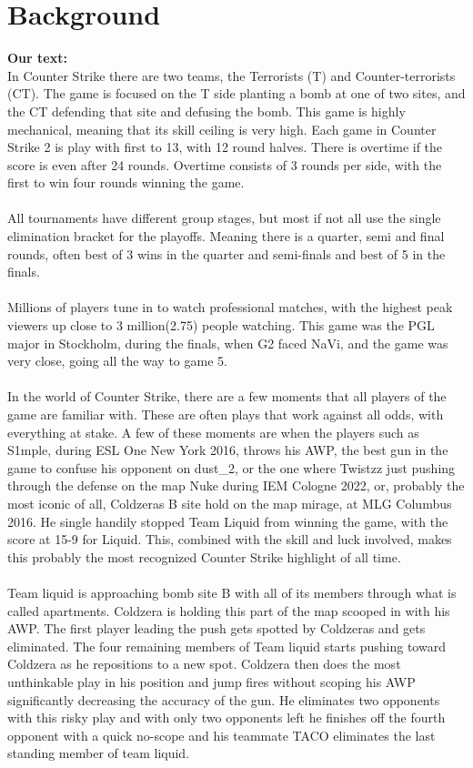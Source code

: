 \documentclass[a4paper,twoside]{bth}
\begin{document}
\section{Background}
\textbf{Our text:}\\
In Counter Strike there are two teams, the Terrorists (T) and Counter-terrorists (CT). The game is focused on the T side planting a bomb at one of two sites, and the CT defending that site and defusing the bomb. This game is highly mechanical, meaning that its skill ceiling is very high. Each game in Counter Strike 2 is play with first to 13, with 12 round halves. There is overtime if the score is even after 24 rounds. Overtime consists of 3 rounds per side, with the first to win four rounds winning the game.
\\\\
All tournaments have different group stages, but most if not all use the single elimination bracket for the playoffs. Meaning there is a quarter, semi and final rounds, often best of 3 wins in the quarter and semi-finals and best of 5 in the finals.
\\\\
Millions of players tune in to watch professional matches, with the highest peak viewers up close to 3 million(2.75) people watching. This game was the PGL major in Stockholm, during the finals, when G2 faced NaVi, and the game was very close, going all the way to game 5.
\\\\
In the world of Counter Strike, there are a few moments that all players of the game are familiar with. These are often plays that work against all odds, with everything at stake. A few of these moments are when the players such as S1mple, during ESL One New York 2016, throws his AWP, the best gun in the game to confuse his opponent on dust\_2, or the one where Twistzz just pushing through the defense on the map Nuke during IEM Cologne 2022, or, probably the most iconic of all, Coldzeras B site hold on the map mirage, at MLG Columbus 2016. He single handily stopped Team Liquid from winning the game, with the score at 15-9 for Liquid. This, combined with the skill and luck involved, makes this probably the most recognized Counter Strike highlight of all time.\\\\
Team liquid is approaching bomb site B with all of its members through what is called apartments. Coldzera is holding this part of the map scooped in with his AWP. The first player leading the push gets spotted by Coldzeras and gets eliminated. The four remaining members of Team liquid starts pushing toward Coldzera as he repositions to a new spot. Coldzera then does the most unthinkable play in his position and jump fires without scoping his AWP significantly decreasing the accuracy of the gun. He eliminates two opponents with this risky play and with only two opponents left he finishes off the fourth opponent with a quick no-scope and his teammate TACO eliminates the last standing member of team liquid. \\\\
\end{document}
